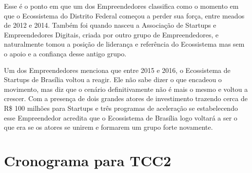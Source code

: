 Esse é o ponto em que um dos Empreendedores classifica como o momento em que o Ecossistema do Distrito Federal começou a perder sua força, entre meados de 2012 e 2014. Também foi quando nasceu a Associação de Startups e Empreendedores Digitais, criada por outro grupo de Empreendedores, e naturalmente tomou a posição de liderança e referência do Ecossistema mas sem o apoio e a confiança desse antigo grupo.

Um dos Empreendedores menciona que entre 2015 e 2016, o Ecossistema de Startups de Brasília voltou a reagir. Ele não sabe dizer o que encadeou o movimento, mas diz que o cenário definitivamente não é mais o mesmo e voltou a crescer. Com a presença de dois grandes atores de investimento trazendo cerca de R\$ 100 milhões para Startups e três programas de aceleração se estabelecendo esse Empreendedor acredita que o Ecossistema de Brasília logo voltará a ser o que era se os atores se unirem e formarem um grupo forte novamente.

\section{Cronograma para TCC2}
\label{section:cronograma_tcc2}